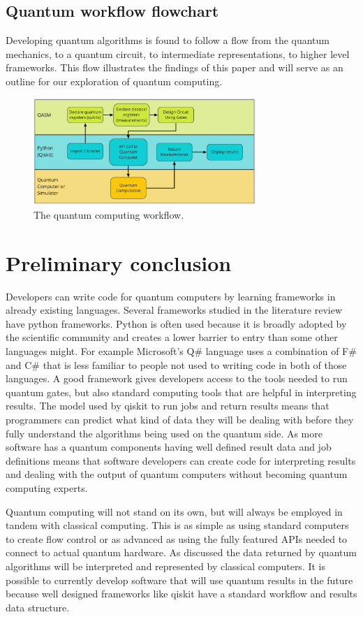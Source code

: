 \documentclass{article}
\begin{document}
\subsection{Quantum workflow flowchart}
Developing quantum algorithms is found to follow a flow from the quantum mechanics, to a quantum circuit, to intermediate representations, to higher level frameworks. This flow illustrates the findings of this paper and will serve as an outline for our exploration of quantum computing. 
\begin{figure}[H]
    \centering
    \includegraphics[width=0.75\textwidth]{qworkflow.png}
    \caption{The quantum computing workflow.}
\end{figure}

\section{Preliminary conclusion}
Developers can write code for quantum computers by learning frameworks in already existing languages. Several frameworks studied in the literature review have python frameworks. Python is often used because it is broadly adopted by the scientific community and creates a lower barrier to entry than some other languages might. For example Microsoft's Q\# language uses a combination of F\# and C\# that is less familiar to people not used to writing code in both of those languages. A good framework gives developers access to the tools needed to run quantum gates, but also standard computing tools that are helpful in interpreting results. The model used by qiskit to run jobs and return results means that programmers can predict what kind of data they will be dealing with before they fully understand the algorithms being used on the quantum side. As more software has a quantum components having well defined result data and job definitions means that software developers can create code for interpreting results and dealing with the output of quantum computers without becoming quantum computing experts.

Quantum computing will not stand on its own, but will always be employed in tandem with classical computing. This is as simple as using standard computers to create flow control or as advanced as using the fully featured APIs needed to connect to actual quantum hardware. As discussed the data returned by quantum algorithms will be interpreted and represented by classical computers. It is possible to currently develop software that will use quantum results in the future because well designed frameworks like qiskit have a standard workflow and results data structure.
\end{document}
